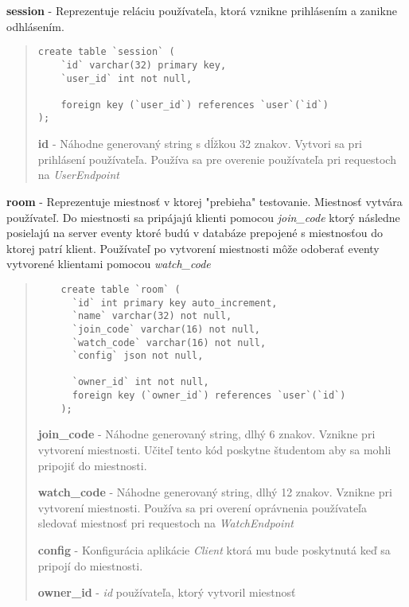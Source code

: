 \documentclass{article}
\newcommand{\filedesc}[1]{\vspace{0.3cm} \noindent \textbf{#1}}
\begin{document}
\filedesc{session} - Reprezentuje reláciu používateľa, ktorá vznikne prihlásením a zanikne odhlásením.

\begin{quote}

\begin{verbatim}
create table `session` (
    `id` varchar(32) primary key,
    `user_id` int not null,

    foreign key (`user_id`) references `user`(`id`)
);
\end{verbatim}

\filedesc{id} - Náhodne generovaný string s dĺžkou 32 znakov. Vytvori sa pri prihlásení používateľa. Používa sa pre overenie používateľa pri requestoch na \emph{UserEndpoint}

\end{quote}

\filedesc{room} - Reprezentuje miestnosť v ktorej "prebieha" testovanie. Miestnosť vytvára používateľ. Do miestnosti sa pripájajú klienti pomocou \emph{join{\_}code} ktorý následne posielajú na server eventy ktoré budú v databáze prepojené s miestnosťou do ktorej patrí klient. Používateľ po vytvorení miestnosti môže odoberať eventy vytvorené klientami pomocou \emph{watch{\_}code}

\begin{quote}
  
  \begin{verbatim}
    create table `room` (
      `id` int primary key auto_increment,
      `name` varchar(32) not null,
      `join_code` varchar(16) not null,
      `watch_code` varchar(16) not null,
      `config` json not null,

      `owner_id` int not null,
      foreign key (`owner_id`) references `user`(`id`)
    );
  \end{verbatim}

  \filedesc{join{\_}code} - Náhodne generovaný string, dlhý 6 znakov. Vznikne pri vytvorení miestnosti. Učiteľ tento kód poskytne študentom aby sa mohli pripojiť do miestnosti.

  \filedesc{watch{\_}code} - Náhodne generovaný string, dlhý 12 znakov. Vznikne pri vytvorení miestnosti. Používa sa pri overení oprávnenia používateľa sledovať miestnosť pri requestoch na \emph{WatchEndpoint}

  \filedesc{config} - Konfigurácia aplikácie \emph{Client} ktorá mu bude poskytnutá keď sa pripojí do miestnosti.
  
  \filedesc{owner{\_}id} - \emph{id} používateľa, ktorý vytvoril miestnosť

\end{quote}
\end{document}
